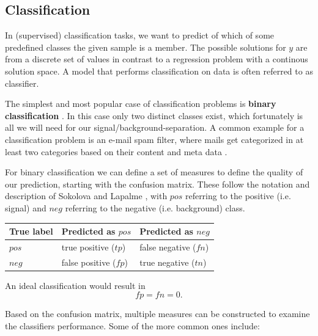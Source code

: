 \subsection{Classification}
In (supervised) classification tasks, we want to predict of which of some 
predefined classes the given sample is a member. The possible solutions for $y$
are from a discrete set of values in 
contrast to a regression problem with a continous solution space.
A model that performs classification on data is often referred to as
classifier.

The simplest and most popular case of classification problems
is \textbf{binary classification} \cite{sokolova2009systematic}.
In this case only two distinct
classes exist, which fortunately is all we will need for
our signal/background-separation.
A common example for a classification problem is an e-mail spam filter,
where mails get categorized in at least two categories based
on their content and meta data \cite{DBLP:journals/corr/cs-CL-0006013}.

For binary classification we can define a set of measures
to define the quality of our prediction, starting with the confusion matrix.
These follow the notation and description of
Sokolova and Lapalme \cite{sokolova2009systematic},
with $pos$ referring to the positive (i.e. signal)
and $neg$ referring to the negative (i.e. background) class.

\begin{center}
    \begin{tabular}{ l l l}
    True label & Predicted as $pos$ & Predicted as $neg$ \\
    \hline
    $pos$ & true positive ($tp$) & false negative ($fn$) \\ 
    $neg$ & false positive ($fp$) & true negative ($tn$) \\
    \end{tabular}
    \label{tab:confusion}
\end{center}

An ideal classification would result in
\begin{equation*}
  fp = fn = 0.
\end{equation*}

Based on the confusion matrix, multiple measures 
can be constructed to examine the classifiers performance.
Some of the more common ones include:

